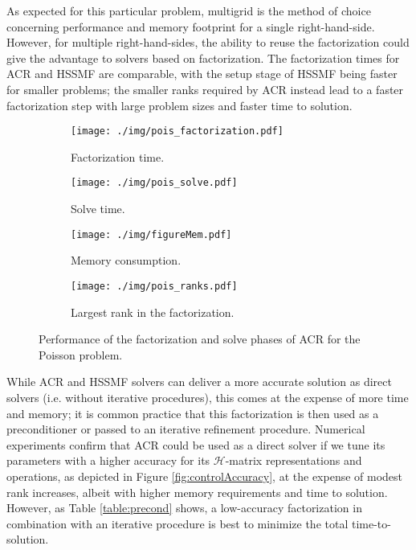 \documentclass[]{elsarticle}
\begin{document}
As expected for this particular problem, multigrid is the method of choice concerning performance and memory footprint for a single right-hand-side. However, for multiple right-hand-sides, the ability to reuse the factorization could give the advantage to solvers based on factorization. The factorization times for ACR and HSSMF are comparable, with the setup stage of HSSMF being faster for smaller problems; the smaller ranks required by ACR instead lead to a faster factorization step with large problem sizes and faster time to solution.

\begin{figure}[]
	\centering
	\begin{subfigure}{.4\textwidth}
		\centering
		\texttt{[image: ./img/pois\_factorization.pdf]}
		\caption{Factorization time.}
		\label{fig:pois11}
	\end{subfigure}
	\begin{subfigure}{.4\textwidth}
		\centering
		\texttt{[image: ./img/pois\_solve.pdf]}
		\caption{Solve time.}
		\label{fig:pois12}
	\end{subfigure}
	\begin{subfigure}{.4\textwidth}
		\centering
		\texttt{[image: ./img/figureMem.pdf]}
		\caption{Memory consumption.}
		\label{fig:pois13}
	\end{subfigure}
	\begin{subfigure}{.4\textwidth}
		\centering
		\texttt{[image: ./img/pois\_ranks.pdf]}
		\caption{Largest rank in the factorization.}
		\label{fig:pois14}
	\end{subfigure}
\caption{Performance of the factorization and solve phases of ACR for the Poisson problem.}
\label{fig:PoissComparisons}
\end{figure}

While ACR and HSSMF solvers can deliver a more accurate solution as direct solvers (i.e. without iterative procedures), this comes at the expense of more time and memory; it is common practice that this factorization is then used as a preconditioner or passed to an iterative refinement procedure. Numerical experiments confirm that ACR could be used as a direct solver if we tune its parameters with a higher accuracy for its $\mathcal{H}$-matrix representations and operations, as depicted in Figure \ref{fig:controlAccuracy}, at the expense of modest rank increases, albeit with higher memory requirements and time to solution. However, as Table \ref{table:precond} shows, a low-accuracy factorization in combination with an iterative procedure is best to minimize the total time-to-solution.
\end{document}
